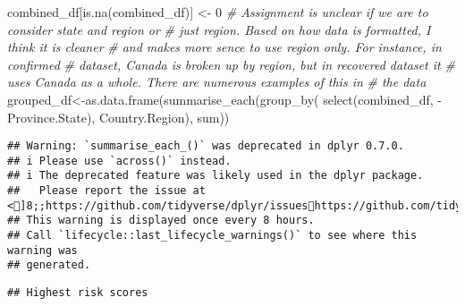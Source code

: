 \documentclass[
]{article}
\newenvironment{Shaded}{\begin{snugshade}}{\end{snugshade}}
\newcommand{\CommentTok}[1]{\textcolor[rgb]{0.56,0.35,0.01}{\textit{#1}}}
\newcommand{\DecValTok}[1]{\textcolor[rgb]{0.00,0.00,0.81}{#1}}
\newcommand{\FunctionTok}[1]{\textcolor[rgb]{0.00,0.00,0.00}{#1}}
\newcommand{\NormalTok}[1]{#1}
\newcommand{\OtherTok}[1]{\textcolor[rgb]{0.56,0.35,0.01}{#1}}
\newcommand{\SpecialCharTok}[1]{\textcolor[rgb]{0.00,0.00,0.00}{#1}}
\newcommand{\StringTok}[1]{\textcolor[rgb]{0.31,0.60,0.02}{#1}}
\begin{document}
\begin{Shaded}
\begin{Highlighting}[]
\NormalTok{combined\_df[}\FunctionTok{is.na}\NormalTok{(combined\_df)] }\OtherTok{\textless{}{-}} \DecValTok{0}
\CommentTok{\# Assignment is unclear if we are to consider state and region or }
\CommentTok{\# just region. Based on how data is formatted, I think it is cleaner }
\CommentTok{\# and makes more sence to use region only.  For instance, in confirmed }
\CommentTok{\# dataset, Canada is broken up by region, but in recovered dataset it }
\CommentTok{\# uses Canada as a whole.  There are numerous examples of this in}
\CommentTok{\# the data}
\NormalTok{grouped\_df}\OtherTok{\textless{}{-}}\FunctionTok{as.data.frame}\NormalTok{(}\FunctionTok{summarise\_each}\NormalTok{(}\FunctionTok{group\_by}\NormalTok{(}
  \FunctionTok{select}\NormalTok{(combined\_df, }\SpecialCharTok{{-}}\NormalTok{Province.State), Country.Region), sum))}
\end{Highlighting}
\end{Shaded}

\begin{verbatim}
## Warning: `summarise_each_()` was deprecated in dplyr 0.7.0.
## i Please use `across()` instead.
## i The deprecated feature was likely used in the dplyr package.
##   Please report the issue at <]8;;https://github.com/tidyverse/dplyr/issueshttps://github.com/tidyverse/dplyr/issues]8;;>.
## This warning is displayed once every 8 hours.
## Call `lifecycle::last_lifecycle_warnings()` to see where this warning was
## generated.
\end{verbatim}

\begin{Shaded}
\end{Shaded}

\begin{verbatim}
## Highest risk scores
\end{verbatim}
\end{document}
